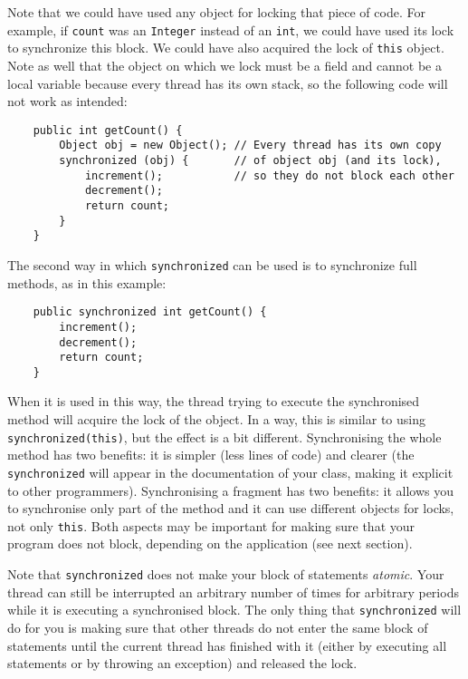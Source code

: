 Note that we could have used any object for locking that piece of
code. For example, if \verb+count+ was an \verb+Integer+ instead of an
\verb+int+, we could have used its lock to synchronize this block. We
could have also acquired the lock of \verb+this+ object. Note as well
that the object on which we lock must be a field and cannot be a local
variable because every thread has its own stack, so the following code
will not work as intended: 

\begin{verbatim}
    public int getCount() {
        Object obj = new Object(); // Every thread has its own copy 
        synchronized (obj) {       // of object obj (and its lock),
            increment();           // so they do not block each other
            decrement();
            return count;
        }
    }
\end{verbatim}

The second way in which \verb+synchronized+ can be used is to
synchronize full methods, as in this example: 

\begin{verbatim}
    public synchronized int getCount() {
        increment();
        decrement();
        return count;
    }
\end{verbatim}

When it is used in this way, the thread trying to execute the
synchronised method will acquire the lock of the object. In a
way, this is similar to using \verb+synchronized(this)+, but the
effect is a bit different. Synchronising the whole method has two
benefits: it is simpler (less lines of code) and clearer (the
\verb+synchronized+ will appear in the documentation of your class,
making it explicit to other programmers). Synchronising a fragment has
two benefits: it allows you to synchronise only part of the method
and it can use different objects for locks, not only \verb+this+. Both
aspects may be important for making sure that your program does
not block, depending on the application (see next section). 

Note that \verb+synchronized+ does not make your block of statements
\emph{atomic}. Your thread can still be interrupted an arbitrary
number of times for arbitrary periods while it is executing a
synchronised block. The only thing that \verb+synchronized+ will do
for you is making sure that other threads do not enter the same block
of statements until the current thread has finished with it (either by
executing all statements or by throwing an exception) and
released the lock. 


